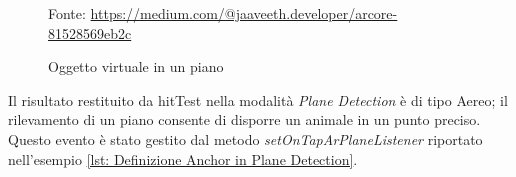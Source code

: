 \documentclass[crop=false, class=book]{standalone}
\begin{document}
	\begin{figure}
			\centering
			{Fonte: \url{https://medium.com/@jaaveeth.developer/arcore-81528569eb2c}}
			\caption{Oggetto virtuale in un piano}
			\label{fig: Oggetto virtuale in un piano}
	\end{figure}
	
	\begin{flushleft}
		Il risultato restituito da hitTest nella modalità \emph{Plane Detection} è di tipo Aereo; il rilevamento di un piano 			consente di disporre un animale in un punto preciso. Questo evento è stato gestito dal metodo 									\textit{setOnTapArPlaneListener} riportato nell'esempio \vref{lst: Definizione Anchor in Plane Detection}.\\
	\end{flushleft}
	
	
			
	
\end{document}
